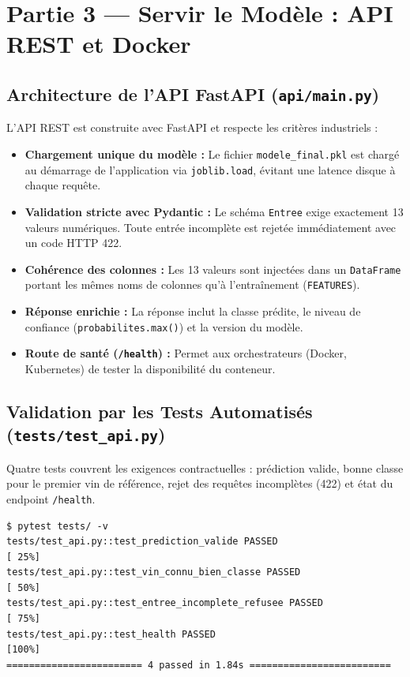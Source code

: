 \documentclass[12pt,a4paper]{article}
\begin{document}
\newpage

\section{Partie 3 — Servir le Modèle : API REST et Docker}

\subsection{Architecture de l'API FastAPI (\texttt{api/main.py})}
L'API REST est construite avec FastAPI et respecte les critères industriels :
\begin{itemize}[leftmargin=*]
  \item \textbf{Chargement unique du modèle :} Le fichier \texttt{modele\_final.pkl} est chargé au démarrage de l'application via \texttt{joblib.load}, évitant une latence disque à chaque requête.
  \item \textbf{Validation stricte avec Pydantic :} Le schéma \texttt{Entree} exige exactement 13 valeurs numériques. Toute entrée incomplète est rejetée immédiatement avec un code HTTP 422.
  \item \textbf{Cohérence des colonnes :} Les 13 valeurs sont injectées dans un \texttt{DataFrame} portant les mêmes noms de colonnes qu'à l'entraînement (\texttt{FEATURES}).
  \item \textbf{Réponse enrichie :} La réponse inclut la classe prédite, le niveau de confiance (\texttt{probabilites.max()}) et la version du modèle.
  \item \textbf{Route de santé (\texttt{/health}) :} Permet aux orchestrateurs (Docker, Kubernetes) de tester la disponibilité du conteneur.
\end{itemize}

\subsection{Validation par les Tests Automatisés (\texttt{tests/test\_api.py})}
Quatre tests couvrent les exigences contractuelles : prédiction valide, bonne classe pour le premier vin de référence, rejet des requêtes incomplètes (422) et état du endpoint \texttt{/health}.

\begin{lstlisting}[style=simplebash]
$ pytest tests/ -v
tests/test_api.py::test_prediction_valide PASSED                         [ 25%]
tests/test_api.py::test_vin_connu_bien_classe PASSED                     [ 50%]
tests/test_api.py::test_entree_incomplete_refusee PASSED                 [ 75%]
tests/test_api.py::test_health PASSED                                    [100%]
======================== 4 passed in 1.84s =========================
\end{lstlisting}
\end{document}
